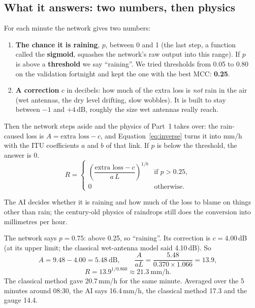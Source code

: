 \subsection{What it answers: two numbers, then physics}
For each minute the network gives two numbers:
\begin{enumerate}
\item \textbf{The chance it is raining}, $p$, between 0 and 1 (the last step, a function called the \textbf{sigmoid}, squashes the network's raw output into this range). If $p$ is above a
\textbf{threshold} we say ``raining''. We tried thresholds from 0.05 to 0.80 on the validation fortnight and kept the
one with the best MCC: \textbf{0.25}.
\item \textbf{A correction} $c$ in decibels: how much of the extra loss is \emph{not} rain in the air (wet antennas,
the dry level drifting, slow wobbles). It is built to stay between $-1$ and $+4$\,dB, roughly the size wet antennas
really reach.
\end{enumerate}
Then the network steps aside and the physics of Part~1 takes over: the rain-caused loss is $A = \text{extra loss} - c$,
and Equation~\ref{eq:inverse} turns it into mm/h with the ITU coefficients $a$ and $b$ of that link. If $p$ is below the
threshold, the answer is 0.
\[
R = \begin{cases} \left(\dfrac{\text{extra loss} - c}{a\,L}\right)^{1/b} & \text{if } p > 0.25,\\[2ex] 0 & \text{otherwise.}\end{cases}
\]

\begin{oneline}
The AI decides whether it is raining and how much of the loss to blame on things other than rain; the century-old
physics of raindrops still does the conversion into millimetres per hour.
\end{oneline}

\begin{example}
The network says $p=0.75$: above 0.25, so ``raining''. Its correction is $c = 4.00$\,dB (at its upper limit; the
classical wet-antenna model said 4.10\,dB). So
\[
A = 9.48 - 4.00 = 5.48\ \text{dB},\qquad
\frac{A}{aL} = \frac{5.48}{0.370\times 1.066} = 13.9,
\]
\[
R = 13.9^{1/0.860} \approx 21.3\ \text{mm/h}.
\]
The classical method gave 20.7\,mm/h for the same minute. Averaged over the 5 minutes around 08:30, the AI says
16.4\,mm/h, the classical method 17.3 and the gauge 14.4.
\end{example}

